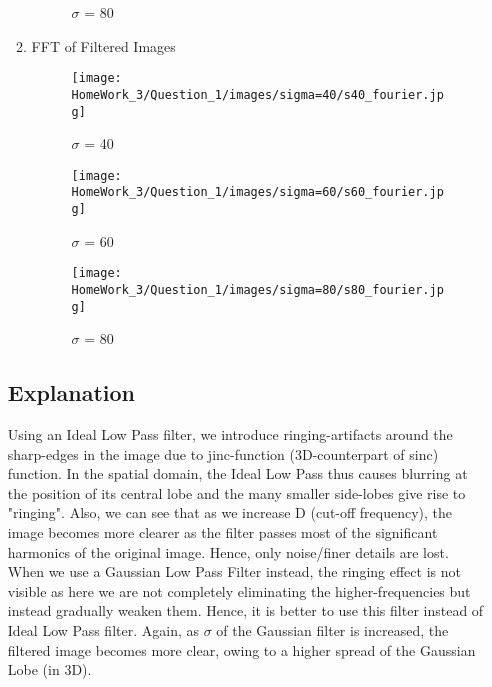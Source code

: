 \documentclass{article}
\begin{document}
\begin{enumerate}
\begin{enumerate}
\begin{figure}[!h]
\begin{minipage}{0.3\textwidth}
                \caption{$\sigma$ = 80}
            \end{minipage}
            \hfill
        \end{figure}
    \FloatBarrier
    \item FFT of Filtered Images
        \begin{figure}[!h]
            \centering
            \begin{minipage}{0.3\textwidth}
                \texttt{[image: HomeWork\_3/Question\_1/images/sigma=40/s40\_fourier.jpg]}
                \caption{$\sigma$ = 40}
            \end{minipage}
            \hfill
                \centering
            \begin{minipage}{0.3\textwidth}
                \texttt{[image: HomeWork\_3/Question\_1/images/sigma=60/s60\_fourier.jpg]}
                \caption{$\sigma$ = 60}
            \end{minipage}
            \hfill
                \centering
            \begin{minipage}{0.3\textwidth}
                \texttt{[image: HomeWork\_3/Question\_1/images/sigma=80/s80\_fourier.jpg]}
                \caption{$\sigma$ = 80}
            \end{minipage}
            \hfill
        \end{figure}

\end{enumerate}
\subsection*{Explanation}
Using an Ideal Low Pass filter, we introduce ringing-artifacts around the sharp-edges in the image due to jinc-function (3D-counterpart of sinc) function. In the spatial domain, the Ideal Low Pass thus causes blurring at the position of its central lobe and  the many smaller side-lobes give rise to "ringing". Also, we can see that as we increase D (cut-off frequency), the image becomes more clearer as the filter passes most of the significant harmonics of the original image. Hence, only noise/finer details are lost.\\
When we use a Gaussian Low Pass Filter instead, the ringing effect is not visible as here we are not completely eliminating the higher-frequencies but instead gradually weaken them. Hence, it is better to use this filter instead of Ideal Low Pass filter. Again, as $\sigma$ of the Gaussian filter is increased, the filtered image becomes more clear, owing to a higher spread of the Gaussian Lobe (in 3D).

\end{enumerate}
\end{document}
